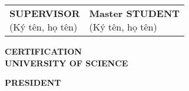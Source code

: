 \vspace{4\baselineskip}
\begin{table}[H]
\begin{adjustbox}{max width =\textwidth}
\begin{tabular}{p{8.44cm}p{8.4cm}}
\multicolumn{1}{p{8.44cm}}{
\centering \textbf{SUPERVISOR} \newline
\centering
(Ký tên, họ tên) \newline
} &
\multicolumn{1}{p{8.4cm}}{
\centering \textbf{Master STUDENT} \newline
\centering
(Ký tên, họ tên) \newline
} \\
\end{tabular}
\end{adjustbox}
\end{table}
\vspace{2\baselineskip}
\begin{center}
    \textbf{CERTIFICATION \\ UNIVERSITY OF SCIENCE}
\end{center}
\begin{center}
    \textbf{PRESIDENT}
\end{center}